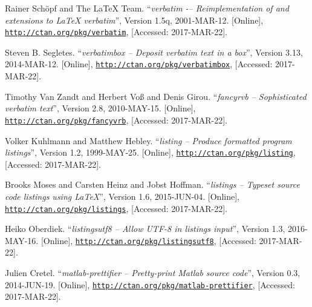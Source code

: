 \documentclass[article,a4paper,oneside,10pt]{memoir}
\begin{document}


\vfill
\begin{thebibliography}{1}

        Rainer Sch\"opf and The \LaTeX{} Team.
        ``\emph{verbatim -– Reimplementation of and extensions to \LaTeX{} verbatim}'',
        Version 1.5q,
        2001-MAR-12.
        [Online],
        \href{http://ctan.org/pkg/verbatim}{\nolinkurl{http://ctan.org/pkg/verbatim}},
        [Accessed: 2017-MAR-22].

        Steven B. Segletes.
        ``\emph{verbatimbox – Deposit verbatim text in a box}'',
        Version 3.13,
        2014-MAR-12.
        [Online],
        \href{http://ctan.org/pkg/verbatimbox}{\nolinkurl{http://ctan.org/pkg/verbatimbox}},
        [Accessed: 2017-MAR-22].

        Timothy Van Zandt and Herbert Vo\ss{} and Denis Girou.
        ``\emph{fancyrvb -- Sophisticated verbatim text}'',
        Version 2.8,
        2010-MAY-15.
        [Online],
        \href{http://ctan.org/pkg/fancyvrb}{\nolinkurl{http://ctan.org/pkg/fancyvrb}},
        [Accessed: 2017-MAR-22].

        Volker Kuhlmann and Matthew Hebley.
        ``\emph{listing -- Produce formatted program listings}'',
        Version 1.2,
        1999-MAY-25.
        [Online],
        \href{http://ctan.org/pkg/listing}{\nolinkurl{http://ctan.org/pkg/listing}},
        [Accessed: 2017-MAR-22].

        Brooks Moses and Carsten Heinz and Jobst Hoffman.
        ``\emph{listings -- Typeset source code listings using \LaTeX}'',
        Version 1.6,
        2015-JUN-04.
        [Online],
        \href{http://ctan.org/pkg/listings}{\nolinkurl{http://ctan.org/pkg/listings}},
        [Accessed: 2017-MAR-22].

        Heiko Oberdiek.
        ``\emph{listingsutf8 -- Allow UTF-8 in listings input}'',
        Version 1.3,
        2016-MAY-16.
        [Online],
        \href{http://ctan.org/pkg/listingsutf8}{\nolinkurl{http://ctan.org/pkg/listingsutf8}},
        [Accessed: 2017-MAR-22].

        Julien Cretel.
        ``\emph{matlab-prettifier -- Pretty-print Matlab source code}'',
        Version 0.3,
        2014-JUN-19.
        [Online],
        \href{http://ctan.org/pkg/matlab-prettifier}{\nolinkurl{http://ctan.org/pkg/matlab-prettifier}},
        [Accessed: 2017-MAR-22].


\end{thebibliography}
\end{document}
